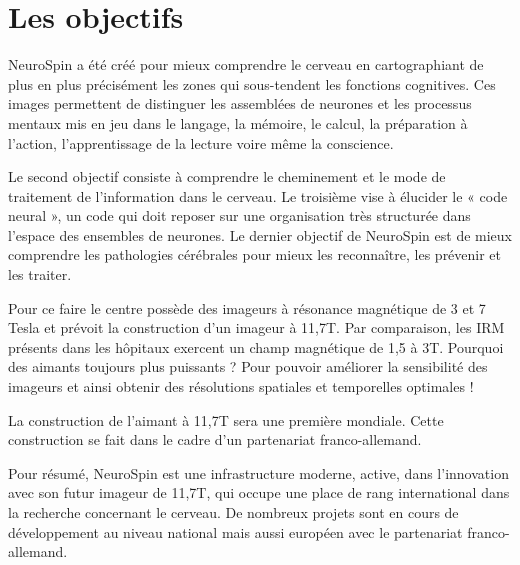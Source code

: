 \section{Les objectifs}

NeuroSpin a été créé pour mieux comprendre le cerveau en cartographiant de plus en plus précisément les zones qui sous-tendent les fonctions cognitives.
Ces images permettent de distinguer les assemblées de neurones et les processus mentaux mis en jeu dans le langage, la mémoire, le calcul, la préparation à l’action, l’apprentissage de la lecture voire même la conscience. 

Le second objectif consiste à comprendre le cheminement et le mode de traitement de l’information dans le cerveau.
Le troisième vise à élucider le « code neural », un code qui doit reposer sur une organisation très structurée dans l’espace des ensembles de neurones.
Le dernier objectif de NeuroSpin est de mieux comprendre les pathologies cérébrales pour mieux les reconnaître, les prévenir et les traiter.

Pour ce faire le centre possède des imageurs à résonance magnétique de 3 et 7 Tesla et prévoit la construction d’un imageur à 11,7T. Par comparaison, les IRM présents dans les hôpitaux exercent un champ magnétique de 1,5 à 3T. Pourquoi des aimants toujours plus puissants ? Pour pouvoir améliorer la sensibilité des imageurs et ainsi obtenir des résolutions spatiales et temporelles optimales !

La construction de l’aimant à 11,7T sera une première mondiale. Cette construction se fait dans le cadre d’un partenariat franco-allemand.

Pour résumé, NeuroSpin est une infrastructure moderne, active, dans l’innovation avec son futur imageur de 11,7T, qui occupe une place de rang international dans la recherche concernant le cerveau. De nombreux projets sont en cours de développement au niveau national mais aussi européen avec le partenariat franco-allemand.
